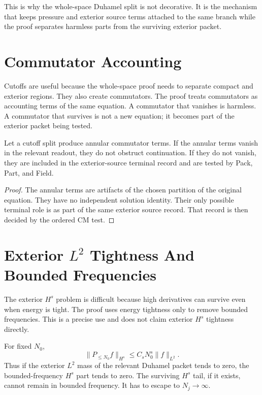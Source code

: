 This is why the whole-space Duhamel split is not decorative.
It is the mechanism that keeps pressure and exterior source terms attached to the same branch while the proof separates harmless parts from the surviving exterior packet.

\section{Commutator Accounting}

Cutoffs are useful because the whole-space proof needs to separate compact and exterior regions.
They also create commutators.
The proof treats commutators as accounting terms of the same equation.
A commutator that vanishes is harmless.
A commutator that survives is not a new equation; it becomes part of the exterior packet being tested.

\begin{lemma}
Let a cutoff split produce annular commutator terms.
If the annular terms vanish in the relevant readout, they do not obstruct continuation.
If they do not vanish, they are included in the exterior-source terminal record and are tested by Pack, Part, and Field.
\end{lemma}

\begin{proof}
The annular terms are artifacts of the chosen partition of the original equation.
They have no independent solution identity.
Their only possible terminal role is as part of the same exterior source record.
That record is then decided by the ordered CM test.
\end{proof}

\section{Exterior \(L^2\) Tightness And Bounded Frequencies}

The exterior \(H^s\) problem is difficult because high derivatives can survive even when energy is tight.
The proof uses energy tightness only to remove bounded frequencies.
This is a precise use and does not claim exterior \(H^s\) tightness directly.

For fixed \(N_0\),
\[
  \|P_{\le N_0}f\|_{H^s}
  \le C_s N_0^s\|f\|_{L^2}.
\]
Thus if the exterior \(L^2\) mass of the relevant Duhamel packet tends to zero, the bounded-frequency \(H^s\) part tends to zero.
The surviving \(H^s\) tail, if it exists, cannot remain in bounded frequency.
It has to escape to \(N_j\to\infty\).

